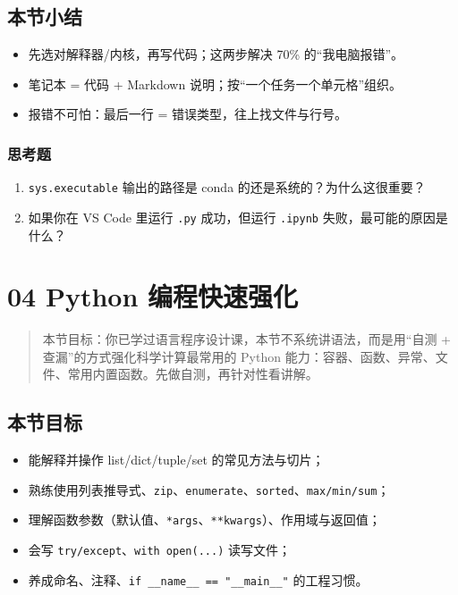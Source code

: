 \subsection{本节小结}\label{ux672cux8282ux5c0fux7ed3}

\begin{itemize}
\tightlist
\item
  先选对解释器/内核，再写代码；这两步解决 70\% 的``我电脑报错''。
\item
  笔记本 = 代码 + Markdown 说明；按``一个任务一个单元格''组织。
\item
  报错不可怕：最后一行 = 错误类型，往上找文件与行号。
\end{itemize}

\subsubsection{思考题}\label{ux601dux8003ux9898}

\begin{enumerate}
\def\labelenumi{\arabic{enumi}.}
\tightlist
\item
  \texttt{sys.executable} 输出的路径是 conda
  的还是系统的？为什么这很重要？
\item
  如果你在 VS Code 里运行 \texttt{.py} 成功，但运行 \texttt{.ipynb}
  失败，最可能的原因是什么？
\end{enumerate}

\section{04 Python
编程快速强化}\label{python-ux7f16ux7a0bux5febux901fux5f3aux5316}

\begin{quote}
本节目标：你已学过语言程序设计课，本节不系统讲语法，而是用``自测 +
查漏''的方式强化科学计算最常用的 Python
能力：容器、函数、异常、文件、常用内置函数。先做自测，再针对性看讲解。
\end{quote}

\subsection{本节目标}\label{ux672cux8282ux76eeux6807-3}

\begin{itemize}
\tightlist
\item
  能解释并操作 list/dict/tuple/set 的常见方法与切片；
\item
  熟练使用列表推导式、\texttt{zip}、\texttt{enumerate}、\texttt{sorted}、\texttt{max/min/sum}；
\item
  理解函数参数（默认值、\texttt{*args}、\texttt{**kwargs}）、作用域与返回值；
\item
  会写 \texttt{try/except}、\texttt{with\ open(...)} 读写文件；
\item
  养成命名、注释、\texttt{if\ \_\_name\_\_\ ==\ "\_\_main\_\_"}
  的工程习惯。
\end{itemize}

